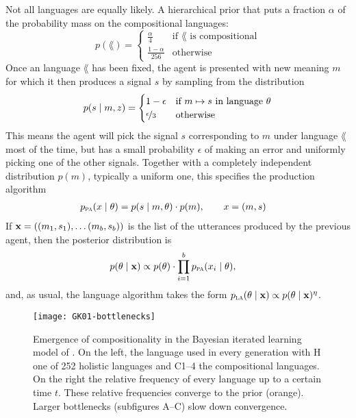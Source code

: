 \documentclass{../src/bcthesispart}
\begin{document}
Not all languages are equally likely. 
A hierarchical prior that puts a fraction $\alpha$ of the probability mass on the compositional languages:
\begin{equation}
    p(\lang) = \begin{cases}
        \frac{\alpha}{4}  		&\text{if $\lang$ is compositional}\\
        \frac{1-\alpha}{256} 	&\text{otherwise}
    \end{cases}
\end{equation}
Once an language $\lang$ has been fixed, the agent is presented with new meaning $m$ for which it then produces a signal $s$ by sampling from the distribution
\begin{equation}
    p(s \mid m, z) = \begin{cases}
        1-\epsilon 				&\text{if $m \mapsto s$ in language $\theta$}\\
        \nicefrac{\epsilon}{3} 	&\text{otherwise}
    \end{cases}
\end{equation}
This means the agent will pick the signal $s$ corresponding to $m$ under language $\lang$ most of the time, but has a small probability $\epsilon$ of making an error and uniformly picking one of the other signals. 
Together with a completely independent distribution $p(m)$, typically a uniform one, this specifies the production algorithm
\begin{align}
	p_{\textsc{pa}}(x \mid \theta) 
		&= p(s \mid m, \theta) \cdot p(m), 
	\qquad x = (m,s)
\end{align}
If $\boldsymbol{\mathbf{x}} = ((m_1, s_1), \dots (m_b, s_b))$ is the list of the utterances produced by the previous agent, then the posterior distribution is
\begin{align}
	p(\theta \mid \boldsymbol{\mathbf{x}}) 
		&\propto p(\theta) 
			\cdot \prod_{i=1}^b p_{\textsc{pa}}(x_i \mid \theta),
\end{align}
and, as usual, the language algorithm takes the form $p_{\textsc{la}}(\theta \mid \boldsymbol{\mathbf{x}}) \propto p(\theta \mid \boldsymbol{\mathbf{x}})^\eta$.




\begin{SCfigure}
	\texttt{[image: GK01-bottlenecks]}
	
	\caption{
	Emergence of compositionality in the Bayesian iterated learning model of \textcite{Griffiths2007a}.
	On the left, the language used in every generation with H one of 252 holistic languages and C1--4 the compositional languages. 
	On the right the relative frequency of every language up to a certain time $t$.
	These relative frequencies converge to the prior (orange).
	Larger bottlenecks (subfigures A--C) slow down convergence.
	\label{fig:GK01-bottlenecks}}
\end{SCfigure}
\end{document}
